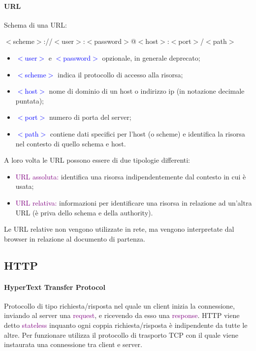 \paragraph{URL} Schema di una URL:
\begin{center}
    $<$scheme$>$://$<$user$>$:$<$password$>$@$<$host$>$:$<$port$>$/$<$path$>$
\end{center}
\begin{itemize}
    \item \textcolor{blue}{$<$user$>$} e \textcolor{blue}{$<$password$>$} opzionale, in generale deprecato;
    \item \textcolor{blue}{$<$scheme$>$} indica il protocollo di accesso alla risorsa;
    \item \textcolor{blue}{$<$host$>$} nome di dominio di un host o indirizzo ip (in notazione decimale puntata);
    \item \textcolor{blue}{$<$port$>$} numero di porta del server;
    \item \textcolor{blue}{$<$path$>$} contiene dati specifici per l’host (o scheme) e identifica la risorsa nel contesto di quello schema e host.
\end{itemize}
A loro volta le URL possono essere di due tipologie differenti:
\begin{itemize}
    \item \textcolor{purple}{URL assoluta:} identifica una risorsa indipendentemente dal contesto in cui è usata;
    \item \textcolor{purple}{URL relativa:} informazioni per identificare una risorsa in relazione ad un’altra URL (è priva dello schema e della authority).
\end{itemize}
Le URL relative non vengono utilizzate in rete, ma vengono interpretate dal browser in relazione al documento di partenza.

\subsection{HTTP}
\paragraph{HyperText Transfer Protocol} Protocollo di tipo richiesta/risposta nel quale un client inizia la connessione, inviando al server una \textcolor{purple}{request}, e ricevendo da esso una \textcolor{purple}{response}. 
HTTP viene detto \textcolor{purple}{stateless} inquanto ogni coppia richiesta/risposta è indipendente da tutte le altre. 
Per funzionare utilizza il protocollo di trasporto TCP con il quale viene instaurata una connessione tra client e server.

